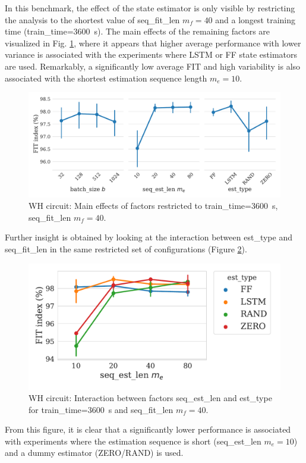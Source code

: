\documentclass{article}
\newcommand{\seqlen}{m}
\begin{document}
In this benchmark, the effect of the state estimator is only visible by restricting the analysis to the shortest value of seq\_fit\_len $m_f=40$ and a longest training time (train\_time=3600~s).
The main effects of the remaining factors are visualized in Fig. \ref{fig:main_effects_restricted_wh}, where it appears that higher average performance with lower variance is associated with the experiments
where LSTM or FF state estimators are used. Remarkably, a significantly low average FIT  and high variability is also associated with the shortest estimation sequence length $\seqlen_e=10$.
\begin{figure}
    \centering
    \includegraphics[width=.7\columnwidth]{figures/wh_main_effects_restricted.pdf}
    \caption{WH circuit: Main effects of factors restricted to train\_time=3600~s, seq\_fit\_len $m_f=40$.}
    \label{fig:main_effects_restricted_wh}
\end{figure}

Further insight is obtained by looking at the interaction between est\_type and seq\_fit\_len in the 
same restricted set of configurations (Figure \ref{fig:interactions_restricted_wh}). 
\begin{figure}
    \centering
    \includegraphics[width=.5\columnwidth]{figures/wh_est_type_interactions_restricted.pdf}
    \caption{WH circuit: Interaction between factors seq\_est\_len and est\_type for train\_time=3600~s and seq\_fit\_len $m_f=40$.}
    \label{fig:interactions_restricted_wh}
\end{figure}
From this figure, it is clear that a significantly lower performance is associated with experiments where the estimation sequence is short 
(seq\_est\_len $\seqlen_e=10$) and a dummy estimator (ZERO/RAND) is used. 
\end{document}
